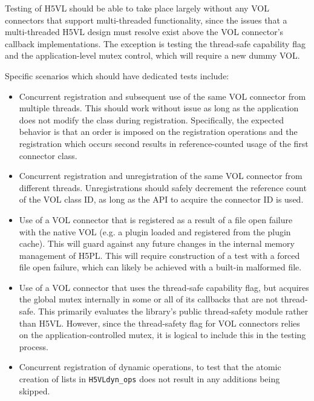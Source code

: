 \documentclass{article}
\begin{document}
Testing of H5VL should be able to take place largely without any VOL connectors that support multi-threaded functionality, since the issues that a multi-threaded H5VL design must resolve exist above the VOL connector's callback implementations. The exception is testing the thread-safe capability flag and the application-level mutex control, which will require a new dummy VOL.

Specific scenarios which should have dedicated tests include:

\begin{itemize}
    \item Concurrent registration and subsequent use of the same VOL connector from multiple threads. This should work without issue as long as the application does not modify the class during registration. Specifically, the expected behavior is that an order is imposed on the registration operations and the registration which occurs second results in reference-counted usage of the first connector class.

    \item Concurrent registration and unregistration of the same VOL connector from different threads. Unregistrations should safely decrement the reference count of the VOL class ID, as long as the API to acquire the connector ID is used. 

    \item Use of a VOL connector that is registered as a result of a file open failure with the native VOL (e.g. a plugin loaded and registered from the plugin cache). This will guard against any future changes in the internal memory management of H5PL. This will require construction of a test with a forced file open failure, which can likely be achieved with a built-in malformed file.

    \item Use of a VOL connector that uses the thread-safe capability flag, but acquires the global mutex internally in some or all of its callbacks that are not thread-safe. This primarily evaluates the library's public thread-safety module rather than H5VL. However, since the thread-safety flag for VOL connectors relies on the application-controlled mutex, it is logical to include this in the testing process.

     \item Concurrent registration of dynamic operations, to test that the atomic creation of lists in \texttt{H5VLdyn\_ops} does not result in any additions being skipped.
     
\end{itemize}
\end{document}
